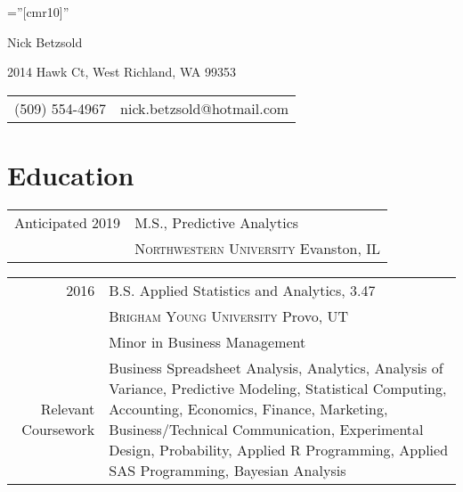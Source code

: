 \documentclass[a4paper,10pt]{article}
\begin{document}

\pagestyle{empty} %

\font\fb=''[cmr10]'' %

\par{\centering
		{\Huge Nick Betzsold
	}\par}

\par{\centering
    {2014 Hawk Ct, West Richland, WA 99353 \\
     \begin{tabular}{rl}
     (509) 554-4967 & nick.betzsold@hotmail.com
     \end{tabular}
    }\par}

\section{Education}
\begin{tabular}{rp{11cm}}	
  Anticipated 2019 & M.S., Predictive Analytics \\
  & \textsc{Northwestern University} Evanston, IL \\
  
\end{tabular}

\begin{tabular}{rp{11cm}}	
  2016 & B.S. Applied Statistics and Analytics, 3.47 \\
  & \textsc{Brigham Young University} Provo, UT \\
  & Minor in Business Management \\
  
  \footnotesize{Relevant Coursework}
  & \footnotesize{
  Business Spreadsheet Analysis,
  Analytics, 
  Analysis of Variance, 
  Predictive Modeling, 
  Statistical Computing,
  Accounting,
  Economics,
  Finance,
  Marketing,
  Business/Technical Communication, 
  Experimental Design,
  Probability,
  Applied R Programming,
  Applied SAS Programming,
  Bayesian Analysis
  }
\end{tabular}
\end{document}
